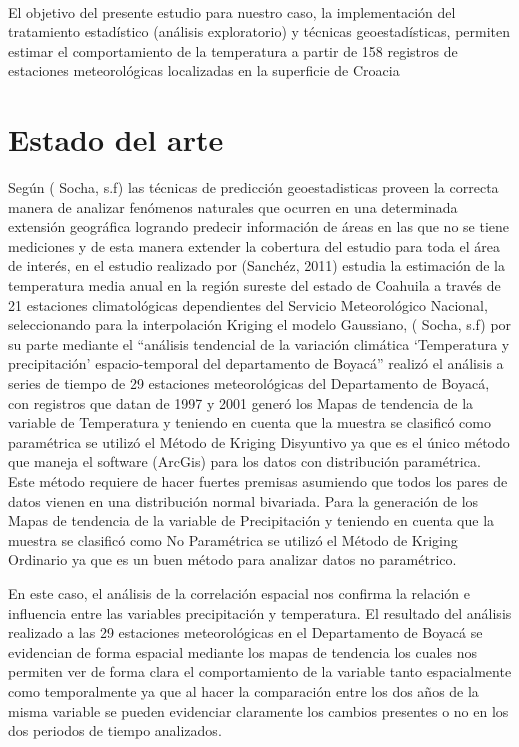 \\
El   objetivo   del   presente   estudio para nuestro caso, la implementación del tratamiento estadístico
(análisis exploratorio) y técnicas geoestadísticas, permiten estimar el comportamiento de la
temperatura a partir de 158 registros de estaciones meteorológicas localizadas en la superficie de Croacia

\section{Estado del arte}

Según ( Socha, s.f)  \cite{temp_boyaca}  las  técnicas  de  predicción  geoestadisticas  proveen  la  correcta  manera  de analizar  fenómenos  naturales  que  ocurren  en  una  determinada  extensión  geográfica  logrando predecir  información  de  áreas  en  las  que  no  se  tiene    mediciones  y  de  esta  manera  extender  la cobertura  del  estudio  para  toda  el  área  de  interés, en el estudio realizado por (Sanchéz, 2011) \cite{sanchez_ea} estudia la estimación de la temperatura media anual  en  la  región  sureste  del  estado  de  Coahuila  a  través  de  21  estaciones  climatológicas  dependientes del Servicio Meteorológico Nacional, seleccionando  para la interpolación Kriging  el  modelo  Gaussiano, 
( Socha, s.f) \cite{temp_boyaca}  por su parte mediante el  ``análisis tendencial de la variación climática `Temperatura y precipitación' espacio-temporal del departamento de Boyacá''  realizó el análisis a series  de  tiempo  de  29 estaciones meteorológicas del Departamento de Boyacá, con registros que datan de 1997 y 2001  generó los Mapas de tendencia de la variable de Temperatura y teniendo en cuenta que la muestra se clasificó como paramétrica se utilizó el Método de Kriging Disyuntivo ya que es el único método que maneja el software (ArcGis) para los datos con distribución paramétrica. Este método requiere de hacer fuertes premisas asumiendo que todos los pares de datos vienen en una distribución normal bivariada. Para la generación de los Mapas de tendencia de la variable de Precipitación y teniendo en cuenta que la muestra se clasificó como No Paramétrica se utilizó el
Método de Kriging Ordinario ya que es un buen método para analizar datos no paramétrico. 

En este caso, el análisis de la correlación espacial nos confirma la relación e influencia entre las variables precipitación y temperatura. El resultado del análisis realizado a las 29 estaciones meteorológicas en el Departamento de Boyacá se evidencian de forma espacial mediante los mapas de tendencia los cuales nos permiten ver de forma clara el comportamiento de la variable tanto espacialmente como temporalmente ya que al hacer la comparación entre los dos años de la misma variable se pueden
evidenciar claramente los cambios presentes o no en los dos periodos de tiempo analizados.

